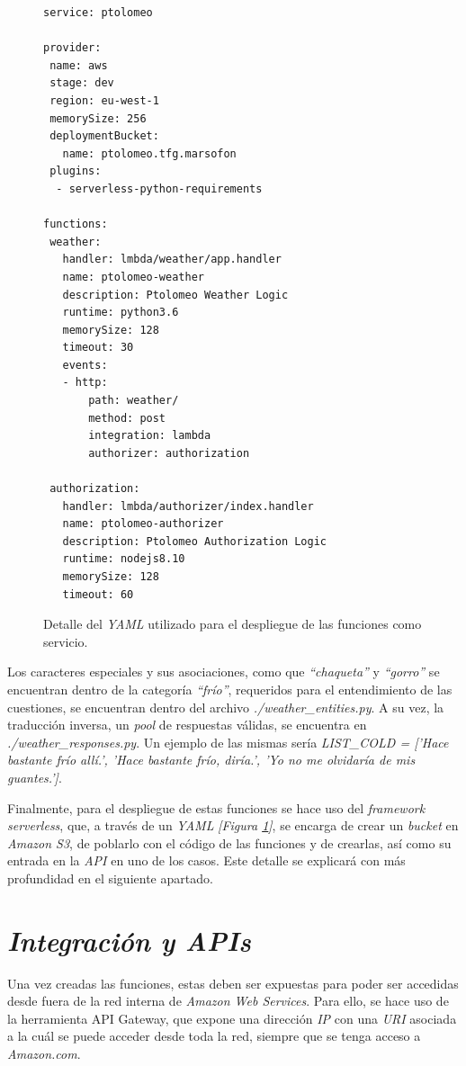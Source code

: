 \documentclass[11pt,spanish,listoffigures]{tfgetsinf}
\begin{document}
\begin{figure}[h!]
    \centering
    \begin{lstlisting}
service: ptolomeo

provider:
 name: aws
 stage: dev
 region: eu-west-1
 memorySize: 256
 deploymentBucket:
   name: ptolomeo.tfg.marsofon
 plugins:
  - serverless-python-requirements

functions:
 weather:
   handler: lmbda/weather/app.handler
   name: ptolomeo-weather
   description: Ptolomeo Weather Logic
   runtime: python3.6
   memorySize: 128
   timeout: 30
   events:
   - http:
       path: weather/
       method: post
       integration: lambda
       authorizer: authorization

 authorization:
   handler: lmbda/authorizer/index.handler
   name: ptolomeo-authorizer
   description: Ptolomeo Authorization Logic
   runtime: nodejs8.10
   memorySize: 128
   timeout: 60
    \end{lstlisting}
    \caption{Detalle del \textit{YAML} utilizado para el despliegue de las funciones como servicio.}
    \label{fig:yaml1}
\end{figure}

Los caracteres especiales y sus asociaciones, como que \textit{“chaqueta”} y \textit{“gorro”} se encuentran dentro de la categoría \textit{“frío”}, requeridos para el entendimiento de las cuestiones, se encuentran dentro del archivo \textit{./weather\_entities.py}. A su vez, la traducción inversa, un \textit{pool} de respuestas válidas, se encuentra en \textit{./weather\_responses.py}. Un ejemplo de las mismas sería \textit{LIST\_COLD = ['Hace bastante frío allí.',  'Hace bastante frío, diría.',  'Yo no me olvidaría de mis guantes.']}.

Finalmente, para el despliegue de estas funciones se hace uso del \textit{framework} \textit{serverless}, que, a través de un \textit{YAML} \textit{[Figura \ref{fig:yaml1}]}, se encarga de crear un \textit{bucket} en \textit{Amazon S3}, de poblarlo con el código de las funciones y de crearlas, así como su entrada en la \textit{API} en uno de los casos. Este detalle se explicará con más profundidad en el siguiente apartado.

\section{\textit{Integración y APIs}}
\label{sec:development-integracion-y-apis}

Una vez creadas las funciones, estas deben ser expuestas para poder ser accedidas desde fuera de la red interna de \textit{Amazon Web Services}. Para ello, se hace uso de la herramienta API Gateway, que expone una dirección \textit{IP} con una \textit{URI} asociada a la cuál se puede acceder desde toda la red, siempre que se tenga acceso a \textit{Amazon.com}. 
\end{document}
